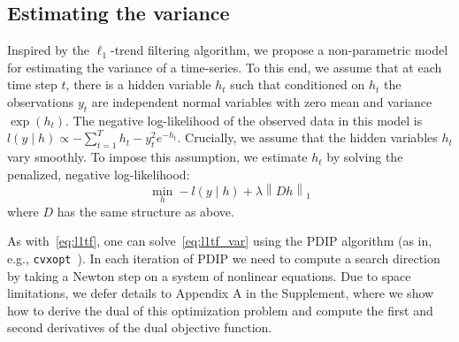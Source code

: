 \documentclass{article}
\newcommand{\given}{\;\vert\;}
\newcommand{\norm}[1]{\left\lVert #1 \right\rVert}
\begin{document}

\subsection{Estimating the variance}
\label{sec:l1tf_var}


Inspired by the $\ell_1$-trend filtering algorithm, we propose a
non-parametric model for estimating the variance of a time-series. To
this end, we assume that at each time step $t$, there is a hidden
variable $h_t$ such that conditioned on $h_t$ the observations $y_t$
are independent normal variables with zero mean and variance
$\exp(h_t)$. The negative log-likelihood of the observed data in this
model is $l(y\given h) \propto -\sum_{t=1}^T h_t - y_t^2e^{-h_t}$. Crucially,
we assume that the hidden variables $h_t$ vary smoothly. To impose
this assumption, we estimate $h_t$ by solving the penalized, negative
log-likelihood: 
\begin{equation}
\min_h -l(y\given h)+\lambda \norm{ Dh }_1
\label{eq:l1tf_var}
\end{equation}
 where $D$ has the same structure as above.

As with~\eqref{eq:l1tf}, one can solve~\eqref{eq:l1tf_var} using the
PDIP algorithm (as in, e.g.,
\texttt{cvxopt}~\citep{andersen_cvxopt:_2013}). In each iteration of
PDIP we need to compute a search direction by taking a Newton
step on a system of nonlinear equations. Due to space limitations, we
defer details to Appendix A in the Supplement, where we show how to derive the dual of this optimization problem and compute the first and second derivatives of the dual objective function. 
\end{document}
